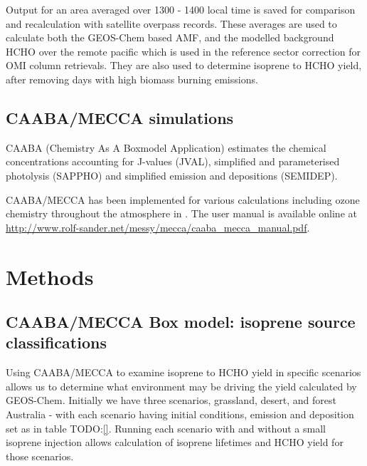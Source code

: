     Output for an area averaged over 1300 - 1400 local time is saved for comparison and recalculation with satellite overpass records.
    These averages are used to calculate both the GEOS-Chem based AMF, and the modelled background HCHO over the remote pacific which is used in the reference sector correction for OMI column retrievals.
    They are also used to determine isoprene to HCHO yield, after removing days with high biomass burning emissions.
  
  \subsection{CAABA/MECCA simulations}
    \label{BioIsop:Model:CM}
    
    CAABA (Chemistry As A Boxmodel Application) estimates the chemical concentrations accounting for J-values (JVAL), simplified and parameterised photolysis (SAPPHO) and simplified emission and depositions (SEMIDEP).
    
    CAABA/MECCA has been implemented for various calculations including ozone chemistry throughout the atmosphere in \cite{Zanis2014}.
    The user manual is available online at \url{http://www.rolf-sander.net/messy/mecca/caaba_mecca_manual.pdf}.
  
\section{Methods}
  \label{BioIsop:Methods}
  
  
  
  \subsection{CAABA/MECCA Box model: isoprene source classifications}
    \label{BioIsop:Methods:CM}
    
    Using CAABA/MECCA to examine isoprene to HCHO yield in specific scenarios allows us to determine what environment may be driving the yield calculated by GEOS-Chem.
    Initially we have three scenarios, grassland, desert, and forest Australia - with each scenario having initial conditions, emission and deposition set as in table TODO:\ref{}.
    Running each scenario with and without a small isoprene injection allows calculation of isoprene lifetimes and HCHO yield for those scenarios.
    
